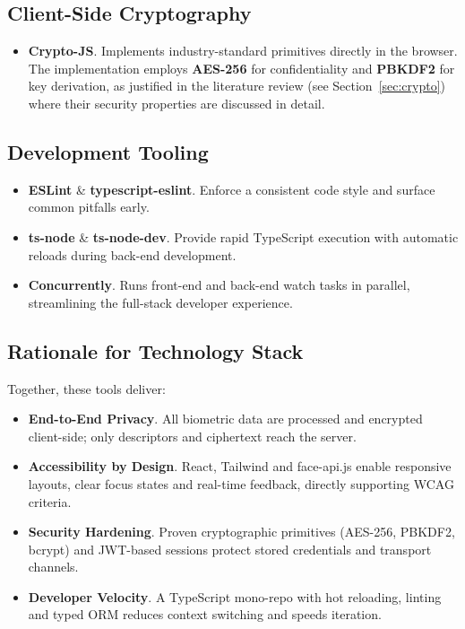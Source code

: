 \subsection*{Client-Side Cryptography}
\begin{itemize}
  \item \textbf{Crypto-JS}. Implements industry-standard primitives directly in the browser. The implementation employs \textbf{AES-256} for confidentiality and \textbf{PBKDF2} for key derivation, as justified in the literature review (see Section~\ref{sec:crypto}) where their security properties are discussed in detail.
\end{itemize}

\subsection*{Development Tooling}
\begin{itemize}
  \item \textbf{ESLint} \& \textbf{typescript-eslint}. Enforce a consistent code style and surface common pitfalls early.
  \item \textbf{ts-node} \& \textbf{ts-node-dev}. Provide rapid TypeScript execution with automatic reloads during back-end development.
  \item \textbf{Concurrently}. Runs front-end and back-end watch tasks in parallel, streamlining the full-stack developer experience.
\end{itemize}

\subsection*{Rationale for Technology Stack}
Together, these tools deliver:

\begin{itemize}
  \item \textbf{End-to-End Privacy}. All biometric data are processed and encrypted client-side; only descriptors and ciphertext reach the server.
  \item \textbf{Accessibility by Design}. React, Tailwind and face-api.js enable responsive layouts, clear focus states and real-time feedback, directly supporting WCAG criteria.
  \item \textbf{Security Hardening}. Proven cryptographic primitives (AES-256, PBKDF2, bcrypt) and JWT-based sessions protect stored credentials and transport channels.  \item \textbf{Developer Velocity}. A TypeScript mono-repo with hot reloading, linting and typed ORM reduces context switching and speeds iteration.
\end{itemize}

